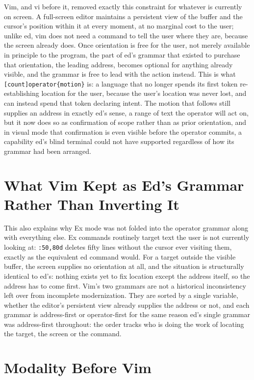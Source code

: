 \documentclass[11pt]{article}
\begin{document}
Vim, and vi before it, removed exactly this constraint for whatever is currently on screen. A full-screen editor maintains a persistent view of the buffer and the cursor's position within it at every moment, at no marginal cost to the user; unlike ed, vim does not need a command to tell the user where they are, because the screen already does. Once orientation is free for the user, not merely available in principle to the program, the part of ed's grammar that existed to purchase that orientation, the leading address, becomes optional for anything already visible, and the grammar is free to lead with the action instead. This is what \texttt{[count]operator\{motion\}} is: a language that no longer spends its first token re-establishing location for the user, because the user's location was never lost, and can instead spend that token declaring intent. The motion that follows still supplies an address in exactly ed's sense, a range of text the operator will act on, but it now does so as confirmation of scope rather than as prior orientation, and in visual mode that confirmation is even visible before the operator commits, a capability ed's blind terminal could not have supported regardless of how its grammar had been arranged.

\section{What Vim Kept as Ed's Grammar Rather Than Inverting It}

This also explains why Ex mode was not folded into the operator grammar along with everything else. Ex commands routinely target text the user is not currently looking at: \texttt{:50,80d} deletes fifty lines without the cursor ever visiting them, exactly as the equivalent ed command would. For a target outside the visible buffer, the screen supplies no orientation at all, and the situation is structurally identical to ed's: nothing exists yet to fix location except the address itself, so the address has to come first. Vim's two grammars are not a historical inconsistency left over from incomplete modernization. They are sorted by a single variable, whether the editor's persistent view already supplies the address or not, and each grammar is address-first or operator-first for the same reason ed's single grammar was address-first throughout: the order tracks who is doing the work of locating the target, the screen or the command.

\section{Modality Before Vim}
\end{document}
